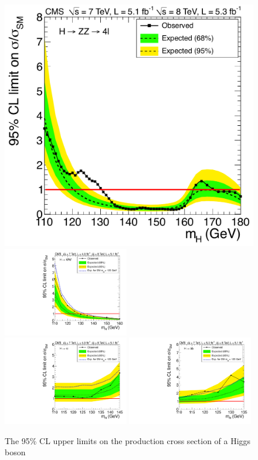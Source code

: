 \documentclass[12pt,twoside,a4paper,cmspaper,final,collab]{cms-tdr}
\begin{document}
\begin{figure}[htbp]
    \begin{center}
 \includegraphics[width=0.49\linewidth]{figures/comb/sqr_acls_hzz_zoom} \includegraphics[width=0.49\textwidth]{figures/comb/sqr_acls_hww_nominal_inject2_ylin} \\
 \includegraphics[width=0.49\textwidth]{figures/comb/sqr_acls_htt_nominal_inject2_ylin}
 \includegraphics[width=0.49\textwidth]{figures/comb/sqr_acls_hbb_nominal_inject2_ylin}
     \caption{The 95\% CL upper limits
on the production cross section of a Higgs boson
}
\end{center}
\end{figure}
\end{document}

